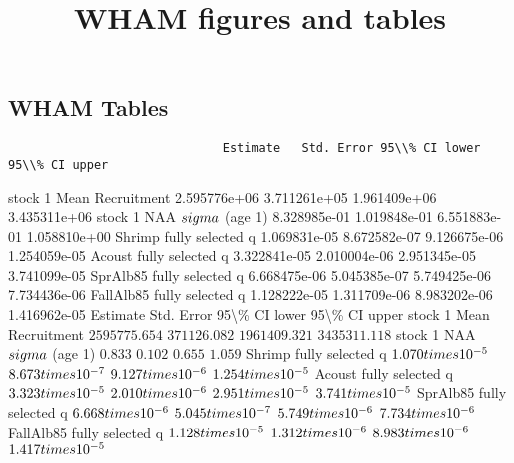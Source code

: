 \documentclass[
]{article}
\title{WHAM figures and tables}
\author{}
\date{\vspace{-2.5em}}
\begin{document}
\maketitle

\subsection{WHAM Tables}\label{wham-tables}

\begin{verbatim}
                              Estimate   Std. Error 95\\% CI lower 95\\% CI upper
\end{verbatim}

stock 1 Mean Recruitment 2.595776e+06 3.711261e+05 1.961409e+06
3.435311e+06 stock 1 NAA \(\\sigma\) (age 1) 8.328985e-01 1.019848e-01
6.551883e-01 1.058810e+00 Shrimp fully selected q 1.069831e-05
8.672582e-07 9.126675e-06 1.254059e-05 Acoust fully selected q
3.322841e-05 2.010004e-06 2.951345e-05 3.741099e-05 SprAlb85 fully
selected q 6.668475e-06 5.045385e-07 5.749425e-06 7.734436e-06 FallAlb85
fully selected q 1.128222e-05 1.311709e-06 8.983202e-06 1.416962e-05
Estimate Std. Error 95\textbackslash\% CI lower 95\textbackslash\% CI
upper stock 1 Mean Recruitment \(2595775.654\) \(371126.082\)
\(1961409.321\) \(3435311.118\) stock 1 NAA \(\\sigma\) (age 1)
\(0.833\) \(0.102\) \(0.655\) \(1.059\) Shrimp fully selected q
\(1.070\\times 10^{-5}\) \(8.673\\times 10^{-7}\)
\(9.127\\times 10^{-6}\) \(1.254\\times 10^{-5}\) Acoust fully selected
q \(3.323\\times 10^{-5}\) \(2.010\\times 10^{-6}\)
\(2.951\\times 10^{-5}\) \(3.741\\times 10^{-5}\) SprAlb85 fully
selected q \(6.668\\times 10^{-6}\) \(5.045\\times 10^{-7}\)
\(5.749\\times 10^{-6}\) \(7.734\\times 10^{-6}\) FallAlb85 fully
selected q \(1.128\\times 10^{-5}\) \(1.312\\times 10^{-6}\)
\(8.983\\times 10^{-6}\) \(1.417\\times 10^{-5}\)
\end{document}
